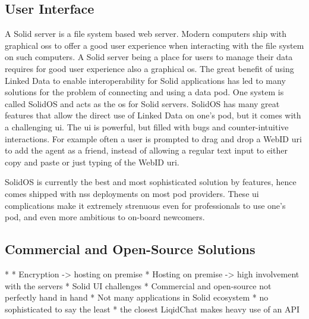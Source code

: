 \subsection{User Interface}

A Solid server is a file system based web server. Modern computers ship with graphical \glspl{os} to offer a good user experience when interacting with the file system on such computers. A Solid server being a place for users to manage their data requires for good user experience also a graphical \gls{os}. The great benefit of using Linked Data to enable interoperability for Solid applications has led to many solutions for the problem of connecting and using a data pod. One system is called SolidOS \cite{solidos} and acts as the \gls{os} for Solid servers. SolidOS has many great features that allow the direct use of Linked Data on one's pod, but it comes with a challenging \gls{ui}. The \gls{ui} is powerful, but filled with bugs and counter-intuitive interactions. For example often a user is prompted to drag and drop a WebID \gls{uri} to add the agent as a friend, instead of allowing a regular text input to either copy and paste or just typing of the WebID \gls{uri}.

SolidOS is currently the best and most sophisticated solution by features, hence comes shipped with \gls{nss} deployments on most pod providers. These \gls{ui} complications make it extremely strenuous even for professionals to use one's pod, and even more ambitious to on-board newcomers.

\subsection{Commercial and Open-Source Solutions}



* 
* Encryption -> hosting on premise
* Hosting on premise -> high involvement with the servers
* Solid UI challenges
* Commercial and open-source not perfectly hand in hand
* Not many applications in Solid ecosystem
    * no sophisticated to say the least
    * the closest LiqidChat makes heavy use of an API